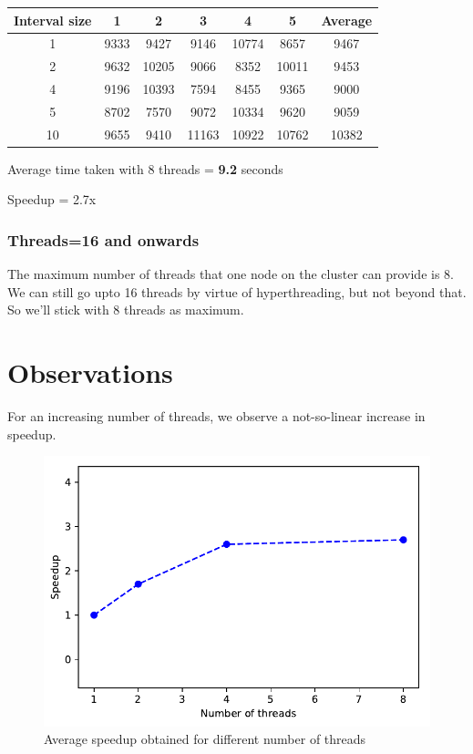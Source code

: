 \documentclass[12pt,letterpaper]{article}
\begin{document}
\begin{center}
\begin{tabular}{c c c c c c c}
\hline
Interval size	&	1		&	2		&	3		&	4		&	5 		& Average	\\
\hline
1				&	9333	&	9427	& 	9146	&	10774	&	8657 	&	9467\\
2				&	9632	&	10205	&	9066	&	8352	&	10011 	&	9453\\
4				&	9196	&	10393	&	7594	&	8455	& 	9365	&	9000\\
5				&	8702	&	7570	&	9072	&	10334	&	9620 	&	9059\\
10				&	9655	&	9410	&	11163	&	10922	&	10762 	&	10382\\
\hline
\end{tabular}
\end{center}

Average time taken with 8 threads = \textbf{9.2} seconds

Speedup = 2.7x


\subsubsection{Threads=16 and onwards}

The maximum number of threads that one node on the cluster can provide is 8. We can still go upto 16 threads by virtue of hyperthreading, but not beyond that. So we'll stick with 8 threads as maximum.

\newpage

\section{Observations}


For an increasing number of threads, we observe a not-so-linear increase in speedup.


\begin{figure}[H]
\centering
\includegraphics{./vssplot}
\caption{Average speedup obtained for different number of threads}
\end{figure}
\end{document}
